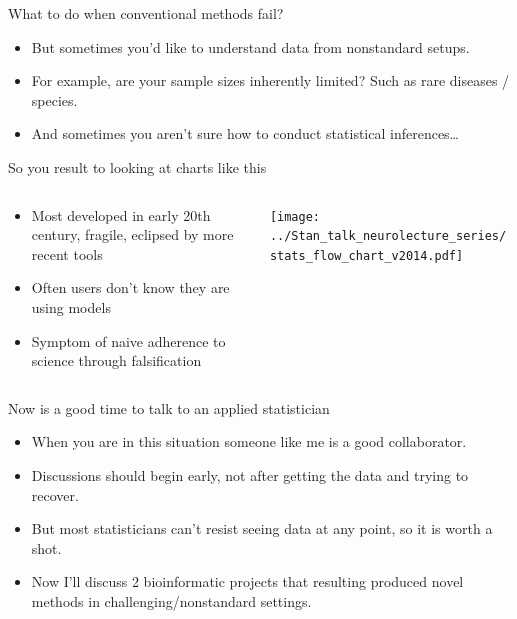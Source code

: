 \documentclass[ignorenonframetext,aspectratio=169,]{beamer}
\providecommand{\tightlist}{%
  \setlength{\itemsep}{0pt}\setlength{\parskip}{0pt}}
\begin{document}
\begin{frame}{%
\protect\hypertarget{what-to-do-when-conventional-methods-fail}{%
What to do when conventional methods fail?}}

\begin{itemize}
\tightlist
\item
  But sometimes you’d like to understand data from nonstandard setups.
\item
  For example, are your sample sizes inherently limited? Such as rare
  diseases / species.
\item
  And sometimes you aren’t sure how to conduct statistical
  inferences\ldots{}
\end{itemize}

\end{frame}

\begin{frame}{%
\protect\hypertarget{so-you-result-to-looking-at-charts-like-this}{%
So you result to looking at charts like this}}

\begin{columns}
\begin{column}{0.5\textwidth}  
    \begin{center}
    \begin{itemize}
        \item Most developed in early 20th century, fragile, eclipsed by more recent tools
        \item Often users don’t know they are using models
        \item Symptom of naive adherence to science through falsification
    \end{itemize}
     \end{center}
\end{column}
\begin{column}{0.5\textwidth}
    \texttt{[image: ../Stan\_talk\_neurolecture\_series/stats\_flow\_chart\_v2014.pdf]}
\end{column}
\end{columns}

\end{frame}

\begin{frame}{%
\protect\hypertarget{now-is-a-good-time-to-talk-to-an-applied-statistician}{%
Now is a good time to talk to an applied statistician}}

\begin{itemize}
\tightlist
\item
  When you are in this situation someone like me is a good collaborator.
\item
  Discussions should begin early, not after getting the data and trying
  to recover.
\item
  But most statisticians can’t resist seeing data at any point, so it is
  worth a shot.
\item
  Now I’ll discuss 2 bioinformatic projects that resulting produced
  novel methods in challenging/nonstandard settings.
\end{itemize}

\end{frame}
\end{document}
